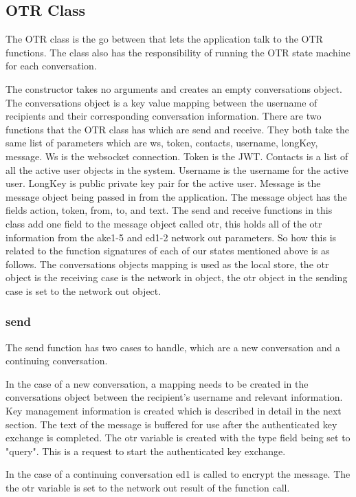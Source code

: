 \subsection{OTR Class}


The OTR class is the go between that lets the application talk to the OTR functions. The class also has the responsibility of running the OTR state machine for each conversation. 


The constructor takes no arguments and creates an empty conversations object. The conversations object is a key value mapping between the username of recipients and their corresponding conversation information. There are two functions that the OTR class has which are send and receive. They both take the same list of parameters which are ws, token, contacts, username, longKey, message. Ws is the websocket connection. Token is the JWT. Contacts is a list of all the active user objects in the system. Username is the username for the active user. LongKey is public private key pair for the active user. Message is the message object being passed in from the application. The message object has the fields action, token, from, to, and text. The send and receive functions in this class add one field to the message object called otr, this holds all of the otr information from the ake1-5 and ed1-2 network out parameters. So how this is related to the function signatures of each of our states mentioned above is as follows. The conversations objects mapping is used as the local store, the otr object is the receiving case is the network in object, the otr object in the sending case is set to the network out object.  


\subsubsection{send}


The send function has two cases to handle, which are a new conversation and a continuing conversation.


In the case of a new conversation, a mapping needs to be created in the conversations object between the recipient's username and relevant information. Key management information is created which is described in detail in the next section. The text of the message is buffered for use after the authenticated key exchange is completed. The otr variable is created with the type field being set to "query". This is a request to start the authenticated key exchange.


In the case of a continuing conversation ed1 is called to encrypt the message. The the otr variable is set to the network out result of the function call. 


